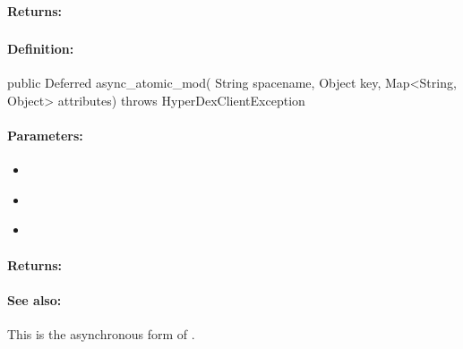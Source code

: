 \paragraph{Returns:}


\pagebreak
\subsubsection{}
\label{api:java:async_atomic_mod}


\paragraph{Definition:}
\begin{javacode}
public Deferred async_atomic_mod(
        String spacename,
        Object key,
        Map<String, Object> attributes) throws HyperDexClientException
\end{javacode}

\paragraph{Parameters:}
\begin{itemize}[noitemsep]
\item {}\\

\item {}\\

\item {}\\

\end{itemize}

\paragraph{Returns:}


\paragraph{See also:}  This is the asynchronous form of .

\pagebreak
